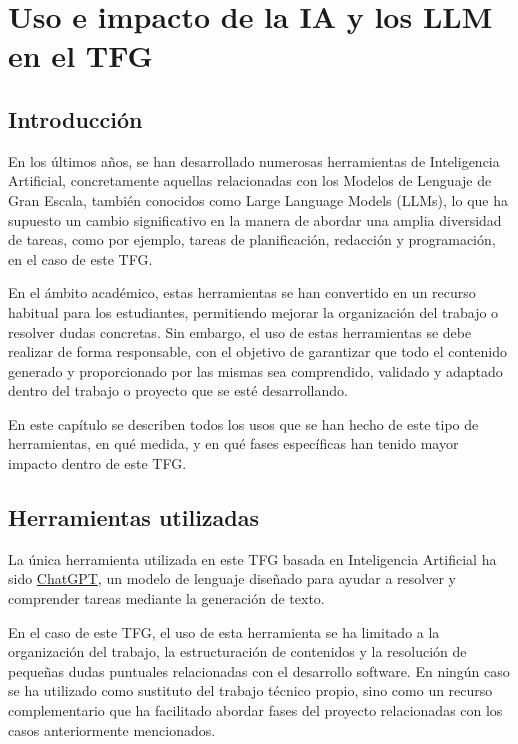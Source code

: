 \chapter{Uso e impacto de la IA y los LLM en el TFG}
\label{cap:capitulo11}

\vspace{0.25cm}

\section{Introducción}
\label{sec:segundaseccion}

En los últimos años, se han desarrollado numerosas herramientas de Inteligencia Artificial, concretamente aquellas relacionadas con los Modelos de Lenguaje de Gran Escala, también conocidos como Large Language Models (LLMs), lo que ha supuesto un cambio significativo en la manera de abordar una amplia diversidad de tareas, como por ejemplo, tareas de planificación, redacción y programación, en el caso de este TFG.

\vspace{0.25cm}

En el ámbito académico, estas herramientas se han convertido en un recurso habitual para los estudiantes, permitiendo mejorar la organización del trabajo o resolver dudas concretas. Sin embargo, el uso de estas herramientas se debe realizar de forma responsable, con el objetivo de garantizar que todo el contenido generado y proporcionado por las mismas sea comprendido, validado y adaptado dentro del trabajo o proyecto que se esté desarrollando.

\vspace{0.25cm}

En este capítulo se describen todos los usos que se han hecho de este tipo de herramientas, en qué medida, y en qué fases específicas han tenido mayor impacto dentro de este TFG.

\section{Herramientas utilizadas}
\label{sec:segundaseccion}

La única herramienta utilizada en este TFG basada en Inteligencia Artificial ha sido \href{https://chatgpt.com/es-ES/}{ChatGPT}, un modelo de lenguaje diseñado para ayudar a resolver y comprender tareas mediante la generación de texto.

\newpage

En el caso de este TFG, el uso de esta herramienta se ha limitado a la organización del trabajo, la estructuración de contenidos y la resolución de pequeñas dudas puntuales relacionadas con el desarrollo software. En ningún caso se ha utilizado como sustituto del trabajo técnico propio, sino como un recurso complementario que ha facilitado abordar fases del proyecto relacionadas con los casos anteriormente mencionados.

